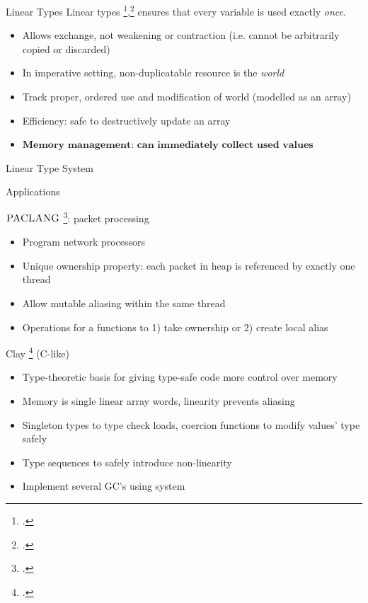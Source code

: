 \documentclass[aspectratio=169]{beamer}
\begin{document}
\begin{frame}{Linear Types}
    Linear types \footcite{girard_linear_1987},\footcite{wadler_linear_1990} ensures that every variable is used exactly \emph{once}.
    \begin{itemize}
        \item Allows exchange, not weakening or contraction (i.e. cannot be arbitrarily copied or discarded)
        \item In imperative setting, non-duplicatable resource is the \emph{world} %
        \item Track proper, ordered use and modification of world (modelled as an array)
        \item Efficiency: safe to destructively update an array
        \item $\textbf{Memory management: can immediately collect used values}$ %
    \end{itemize}
\end{frame}

\begin{frame}{Linear Type System}
\end{frame}

\begin{frame}{Applications}
\footnotesize{
$\textsc{PACLANG}$ \footcite{ennals_linear_2004}: packet processing
  \begin{itemize}
    \item Program network processors %
    \item Unique ownership property: each packet in heap is referenced by exactly one thread
    \item Allow mutable aliasing within the same thread
    \item Operations for a functions to 1) take ownership or 2) create local alias
  \end{itemize}
Clay \footcite{hawblitzel_low-level_2004} (C-like)
  \begin{itemize}
    \item Type-theoretic basis for giving type-safe code more control over memory
    \item Memory is single linear array words, linearity prevents aliasing
    \item Singleton types to type check loads, coercion functions to modify values' type safely
    \item Type sequences to safely introduce non-linearity %
    \item Implement several GC's using system
  \end{itemize}
}
\end{frame}
\end{document}
